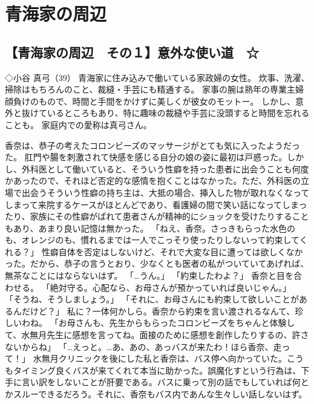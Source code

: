 \chapter{青海家の周辺}
\section{【青海家の周辺　その１】意外な使い道　☆}

◇小谷 真弓（39）
青海家に住み込みで働いている家政婦の女性。
炊事、洗濯、掃除はもちろんのこと、裁縫・手芸にも精通する。
家事の腕は熟年の専業主婦顔負けのもので、時間と手間をかけずに美しくが彼女のモットー。
しかし、意外と抜けているところもあり、特に趣味の裁縫や手芸に没頭すると時間を忘れることも。
家庭内での愛称は真弓さん。

香奈は、恭子の考えたコロンビーズのマッサージがとても気に入ったようだった。
肛門や腸を刺激されて快感を感じる自分の娘の姿に最初は戸惑った。しかし、外科医として働いていると、そういう性癖を持った患者に出会うことも何度かあったので、それほど否定的な感情を抱くことはなかった。ただ、外科医の立場で出会うそういう性癖の持ち主は、大抵の場合、挿入した物が取れなくなってしまって来院するケースがほとんどであり、看護婦の間で笑い話になってしまったり、家族にその性癖がばれて患者さんが精神的にショックを受けたりすることもあり、あまり良い記憶は無かった。
「ねえ、香奈。さっきもらった水色のも、オレンジのも、慣れるまでは一人でこっそり使ったりしないって約束してくれる？」
性癖自体を否定はしないけど、それで大変な目に遭っては欲しくなかった。だから、恭子の言うとおり、少なくとも医者の私がついていてあげれば、無茶なことにはならないはず。
「…うん。」
「約束したわよ？」
香奈と目を合わせる。
「絶対守る。心配なら、お母さんが預かっていれば良いじゃん。」
「そうね、そうしましょう。」
「それに、お母さんにも約束して欲しいことがあるんだけど？」
私に？一体何かしら。香奈から約束を言い渡されるなんて、珍しいわね。
「お母さんも、先生からもらったコロンビーズをちゃんと体験して、水無月先生に感想を言ってね。面接のために感想を創作したりするの、許さないからね」
「…えっと。…あ、あの、あっバスが来たわ！ほら香奈、走って！」
水無月クリニックを後にした私と香奈は、バス停へ向かっていた。こうもタイミング良くバスが来てくれて本当に助かった。誤魔化すという行為は、下手に言い訳をしないことが肝要である。バスに乗って別の話でもしていれば何とかスルーできるだろう。それに、香奈もバス内であんな生々しい話しないはず。

